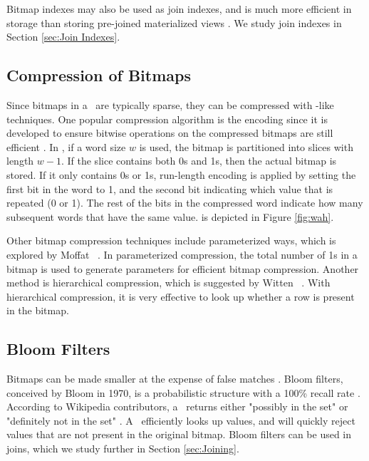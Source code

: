 Bitmap indexes may also be used as join indexes, and is much more efficient in storage than storing pre-joined materialized views \cite{noauthor_undated-hp}. We study join indexes in Section \ref{sec:Join Indexes}.


\subsection{Compression of Bitmaps}
\label{sub:Compression of Bitmaps}


Since bitmaps in a \biti~are typically sparse, they can be compressed with \rle-like techniques. One popular compression algorithm is the  encoding since it is developed to ensure bitwise operations on the compressed bitmaps are still efficient \cite{Bjorklund2011-wh}. In , if a word size $w$ is used, the bitmap is partitioned into slices with length $w-1$. If the slice contains both 0s and 1s, then the actual bitmap is stored. If it only contains 0s or 1s, run-length encoding is applied by setting the first bit in the word to 1, and the second bit indicating which value that is repeated (0 or 1). The rest of the bits in the compressed word indicate how many subsequent words that have the same value.  is depicted in Figure \ref{fig:wah}.

Other bitmap compression techniques include parameterized ways, which is explored by Moffat \ea~\cite{Moffat1992-tz}. In parameterized compression, the total number of 1s in a bitmap is used to generate parameters for efficient bitmap compression. Another method is hierarchical compression, which is suggested by Witten \ea~\cite{Witten1999-qq}. With hierarchical compression, it is very effective to look up whether a row is present in the bitmap.


\subsection{Bloom Filters}
\label{sub:Bloom Filter}
Bitmaps can be made smaller at the expense of false matches \cite{Witten1999-qq}. Bloom filters, conceived by Bloom in 1970, is a probabilistic structure with a 100\% recall rate \cite{Bloom1970-nr, Wikipedia_contributors2015-lq}. According to Wikipedia contributors, a \bloom~returns either "possibly in the set" or "definitely not in the set" \cite{Wikipedia_contributors2015-lq}. A \bloom~efficiently looks up values, and will quickly reject values that are not present in the original bitmap. Bloom filters can be used in joins, which we study further in Section \ref{sec:Joining}.

